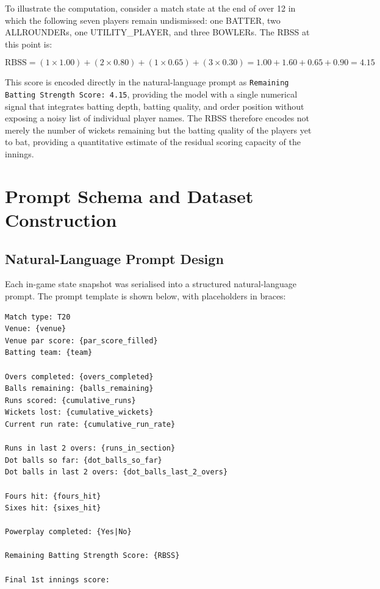 To illustrate the computation, consider a match state at the end of over 12 in which the following seven players remain undismissed: one BATTER, two ALL\-ROUNDERs, one UTILITY\_PLAYER, and three BOWLERs. The RBSS at this point is:

\begin{equation}
    \text{RBSS} = (1 \times 1.00) + (2 \times 0.80) + (1 \times 0.65) + (3 \times 0.30)
    = 1.00 + 1.60 + 0.65 + 0.90 = 4.15
\end{equation}

This score is encoded directly in the natural-language prompt as \texttt{Remaining Batting Strength Score: 4.15}, providing the model with a single numerical signal that integrates batting depth, batting quality, and order position without exposing a noisy list of individual player names. The RBSS therefore encodes not merely the number of wickets remaining but the batting quality of the players yet to bat, providing a quantitative estimate of the residual scoring capacity of the innings.

\section{Prompt Schema and Dataset Construction}

\subsection{Natural-Language Prompt Design}

Each in-game state snapshot was serialised into a structured natural-language prompt. The prompt template is shown below, with placeholders in braces:

\begin{verbatim}
Match type: T20
Venue: {venue}
Venue par score: {par_score_filled}
Batting team: {team}

Overs completed: {overs_completed}
Balls remaining: {balls_remaining}
Runs scored: {cumulative_runs}
Wickets lost: {cumulative_wickets}
Current run rate: {cumulative_run_rate}

Runs in last 2 overs: {runs_in_section}
Dot balls so far: {dot_balls_so_far}
Dot balls in last 2 overs: {dot_balls_last_2_overs}

Fours hit: {fours_hit}
Sixes hit: {sixes_hit}

Powerplay completed: {Yes|No}

Remaining Batting Strength Score: {RBSS}

Final 1st innings score:
\end{verbatim}

